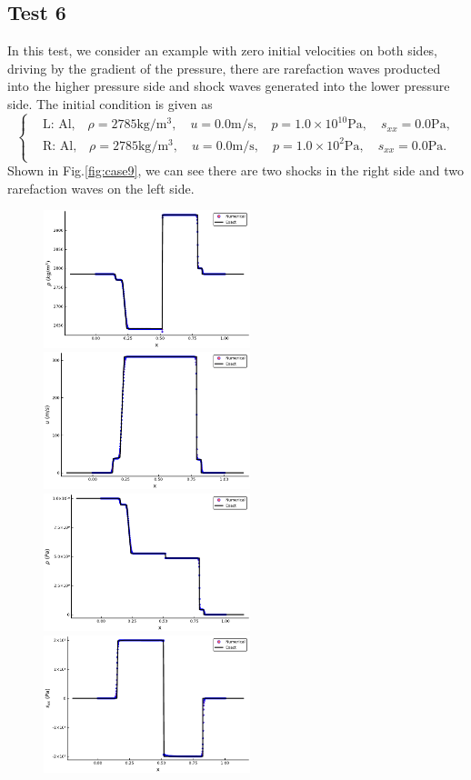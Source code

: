 \documentclass[review]{elsarticle}
\begin{document}
\begin{enumerate}[Step 1]
\subsection{Test 6}
In this test, we consider an example with zero initial velocities on both sides, driving by the gradient of the pressure, there are rarefaction waves producted into the higher pressure side and shock waves generated into the lower pressure side. The initial condition is given as
\begin{equation}
 \left\{ \begin{aligned}
	 &	 \text{L: Al,}\quad  \rho = 2785 \text{kg}/\text{m}^3, \quad  u = 0.0\text{m}/\text{s}, \quad  p = 1.0\times 10^{10} \text{Pa}, \quad s_{xx}= 0.0 \text{Pa},\\
	 &	 \text{R: Al,}\quad  \rho = 2785 \text{kg}/\text{m}^3, \quad  u = 0.0\text{m}/\text{s}, \quad  p = 1.0 \times 10^2 \text{Pa}, \quad  s_{xx}=0.0\text{Pa}.\\
   \end{aligned}
 \right.
\end{equation}
Shown in Fig.\ref{fig:case9}, we can see there are two shocks in the right side and two rarefaction waves on the left side. 
\begin{figure}
  \centering

  \includegraphics[width= 6cm] {case9rho.pdf}
  \includegraphics[width= 6cm] {case9u.pdf}
  \includegraphics[width= 6cm] {case9p.pdf}
  \includegraphics[width= 6cm] {case9sxx.pdf}


\end{figure}
\end{enumerate}
\end{document}
